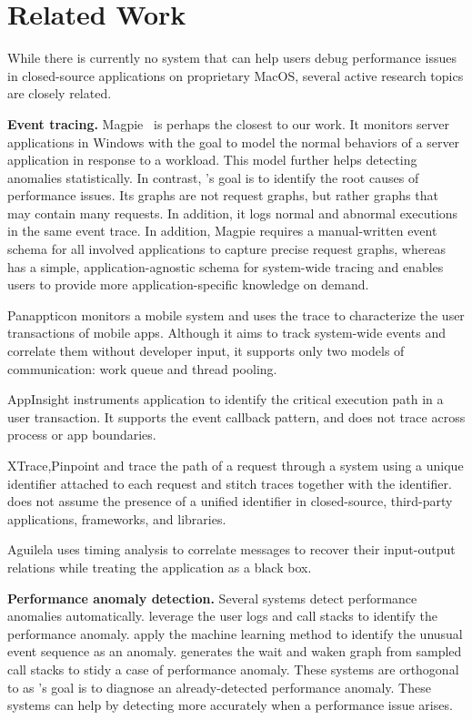 \section{Related Work}
\label{sec:related-work}

While there is currently no system that can help users debug performance
issues in closed-source applications on proprietary MacOS, several active
research topics are closely related.

\textbf{Event tracing.}  Magpie~\cite{barham2004using} is perhaps the closest to
our work.  It monitors server applications in Windows with the goal to model
the normal behaviors of a server application in response to a workload.  This
model further helps detecting anomalies statistically.  In contrast, \xxx's
goal is to identify the root causes of performance issues.  Its graphs are not
request graphs, but rather graphs that may contain many requests.  In addition,
it logs normal and abnormal executions in the same event trace.  In addition,
Magpie requires a manual-written event schema for all involved applications to
capture precise request graphs, whereas \xxx has a simple, application-agnostic
schema for system-wide tracing and enables users to provide more
application-specific knowledge on demand.

Panappticon \cite{zhang2013panappticon} monitors a mobile system and uses the
trace to characterize the user transactions of mobile apps.  Although it
aims to track system-wide events and correlate them without developer
input, it supports only two models of communication: work queue and thread
pooling.

AppInsight \cite{ravindranath2012appinsight} instruments application to
identify the critical execution path in a user transaction.  It supports the
event callback pattern, and does not trace across process or app boundaries.

XTrace\cite{fonseca2007x},Pinpoint \cite{chen2002pinpoint} and
\cite{chow2014mystery} trace the path of a request through a system using
a unique identifier attached to each request and stitch traces together with
the identifier.  \xxx does not assume the presence of a unified identifier in
closed-source, third-party applications, frameworks, and libraries.

Aguilela \cite{aguilera2003performance} uses timing analysis to correlate
messages to recover their input-output relations while treating the application
as a black box.

\textbf{Performance anomaly detection.}  Several systems detect performance
anomalies automatically.  \cite{han2012performance} \cite{yuan2012conservative}
leverage the user logs and call stacks to identify the performance anomaly.
\cite{cohen2004correlating} \cite{saidi2008full} \cite{xu2009detecting}
\cite{du2017deeplog}apply the machine learning method to identify the unusual
event sequence as an anomaly.  \cite{yu2014comprehending} generates the wait
and waken graph from sampled call stacks to stidy a case of performance
anomaly.  These systems are orthogonal to \xxx as \xxx's goal is to diagnose an
already-detected performance anomaly.  These systems can help \xxx by detecting
more accurately when a performance issue arises.
